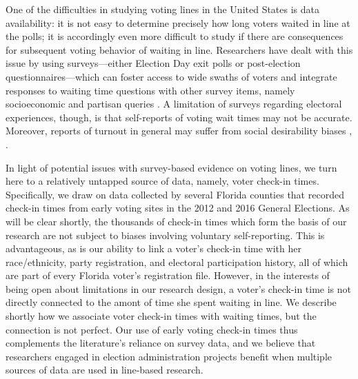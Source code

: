 \documentclass[12pt,titlepage]{article}
\begin{document}
One of the difficulties in studying voting lines in the United States
is data availability: it is not easy to determine precisely how long
voters waited in line at the polls; it is accordingly even more
difficult to study if there are consequences for subsequent voting
behavior of waiting in line.  Researchers have dealt with this issue
by using surveys---either Election Day exit polls or post-election
questionnaires---which can foster access to wide swaths of voters and
integrate responses to waiting time questions with other survey items,
namely socioeconomic and partisan queries
\citep{stewart:waitingtovote2012}.  A limitation of surveys regarding
electoral experiences, though, is that self-reports of voting wait
times may not be accurate.  Moreover, reports of turnout in general
may suffer from social desirability biases
\citep{karpbrockington:overreport}, \citep{bellietal:overreport}.

In light of potential issues with survey-based evidence on voting
lines, we turn here to a relatively untapped source of data, namely,
voter check-in times. Specifically, we draw on data collected by
several Florida counties that recorded check-in times from early
voting sites in the 2012 and 2016 General Elections.  As will be clear
shortly, the thousands of check-in times which form the basis of our
research are not subject to biases involving voluntary self-reporting.
This is advantageous, as is our ability to link a voter's check-in
time with her race/ethnicity, party registration, and electoral
participation history, all of which are part of every Florida voter's
registration file.  However, in the interests of being open about
limitations in our research design, a voter's check-in time is not
directly connected to the amont of time she spent waiting in line.  We
describe shortly how we associate voter check-in times with waiting
times, but the connection is not perfect.  Our use of early voting
check-in times thus complements the literature's reliance on survey
data, and we believe that researchers engaged in election
administration projects benefit when multiple sources of data are used
in line-based research.
\end{document}
